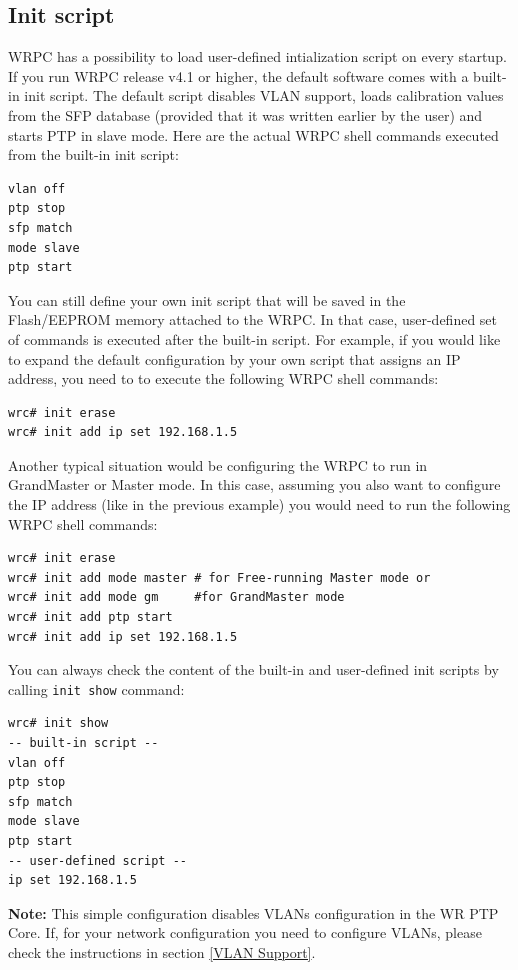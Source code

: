 \documentclass[a4paper, 12pt]{article}
\renewcommand{\_}{\underscore\allowbreak}
\begin{document}
\subsection{Init script}
\label{Init script}
WRPC has a possibility to load user-defined intialization script on every
startup. If you run WRPC release v4.1 or higher, the default software
comes with a built-in init script. The default script disables VLAN support,
loads calibration values from the SFP database (provided that it was written
earlier by the user) and starts PTP in slave mode. Here are the actual WRPC
shell commands executed from the built-in init script:
\begin{lstlisting}
vlan off
ptp stop
sfp match
mode slave
ptp start
\end{lstlisting}

You can still define your own init script that will be saved in the
Flash/EEPROM memory attached to the WRPC. In that case, user-defined set of
commands is executed after the built-in script. For example, if you would
like to expand the default configuration by your own script that assigns an IP
address, you need to to execute the following WRPC shell commands:
\begin{lstlisting}
wrc# init erase
wrc# init add ip set 192.168.1.5
\end{lstlisting}

Another typical situation would be configuring the WRPC to run in GrandMaster or
Master mode. In this case, assuming you also want to configure the IP address
(like in the previous example) you would need to run the following WRPC shell
commands:
\begin{lstlisting}
wrc# init erase
wrc# init add mode master # for Free-running Master mode or
wrc# init add mode gm     #for GrandMaster mode
wrc# init add ptp start
wrc# init add ip set 192.168.1.5
\end{lstlisting}

You can always check the content of the built-in and user-defined init scripts
by calling \texttt{init show} command:
\begin{lstlisting}
wrc# init show
-- built-in script --
vlan off
ptp stop
sfp match
mode slave
ptp start
-- user-defined script --
ip set 192.168.1.5
\end{lstlisting}

\noindent\textbf{Note:} This simple configuration disables VLANs configuration
in the WR PTP Core. If, for your network configuration you need to configure
VLANs, please check the instructions in section \ref{VLAN Support}.
\end{document}

